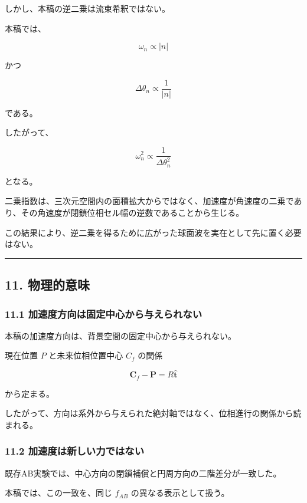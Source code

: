 \documentclass[
  a4paper,
]{ltjsarticle}
\begin{document}
しかし、本稿の逆二乗は流束希釈ではない。

本稿では、

\[
\omega_n\propto|n|
\]

かつ

\[
\Delta\theta_n\propto\frac{1}{|n|}
\]

である。

したがって、

\[
\omega_n^2
\propto
\frac{1}{\Delta\theta_n^2}
\]

となる。

二乗指数は、三次元空間内の面積拡大からではなく、加速度が角速度の二乗であり、その角速度が閉鎖位相セル幅の逆数であることから生じる。

この結果により、逆二乗を得るために広がった球面波を実在として先に置く必要はない。

\begin{center}\rule{0.5\linewidth}{0.5pt}\end{center}

\subsection{11. 物理的意味}\label{ux7269ux7406ux7684ux610fux5473}

\subsubsection{11.1
加速度方向は固定中心から与えられない}\label{ux52a0ux901fux5ea6ux65b9ux5411ux306fux56faux5b9aux4e2dux5fc3ux304bux3089ux4e0eux3048ux3089ux308cux306aux3044}

本稿の加速度方向は、背景空間の固定中心から与えられない。

現在位置 \(P\) と未来位相位置中心 \(C_f\) の関係

\[
\boldsymbol C_f-\boldsymbol P
=R\hat{\boldsymbol t}
\]

から定まる。

したがって、方向は系外から与えられた絶対軸ではなく、位相進行の関係から読まれる。

\subsubsection{11.2
加速度は新しい力ではない}\label{ux52a0ux901fux5ea6ux306fux65b0ux3057ux3044ux529bux3067ux306fux306aux3044}

既存AB実験では、中心方向の閉鎖補償と円周方向の二階差分が一致した。

本稿では、この一致を、同じ \(f_{AB}\) の異なる表示として扱う。
\end{document}
